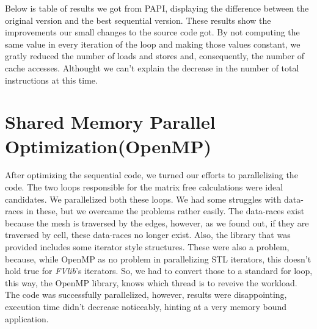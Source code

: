 \documentclass[a4paper,10pt,openright,openbib,twocolumn]{article}
\begin{document}
Below is table of results we got from PAPI, displaying the difference between the original version and the best sequential version. 
These results show the improvements our small changes to the source code got. By not computing the same value in every iteration of the loop and making those values constant, we gratly reduced the number of loads and stores and, consequently, the number of cache accesses. Althought we can't explain the decrease in the number of total instructions at this time. 

\begin{table}[!htp]
    \caption{PAPI comparison}
    \label{tab:testcases}
\end{table}



\section{Shared Memory Parallel Optimization(OpenMP)}
\label{sec:openmp}
After optimizing the sequential code, we turned our efforts to parallelizing the code. The two loops responsible for the matrix free calculations were ideal candidates. We parallelized both these loops. We had some struggles with data-races in these, but we overcame the problems rather easily. The data-races exist because the mesh is traversed by the edges, however, as we found out, if they are traversed by cell, these data-races no longer exist. Also, the library that was provided includes some iterator style structures. These were also a problem, because, while OpenMP as no problem in parallelizing STL iterators, this doesn't hold true for \emph{FVlib}'s iterators. So, we had to convert those to a standard for loop, this way, the OpenMP library, knows which thread is to reveive the workload. The code was successfully parallelized, however, results were disappointing, execution time didn't decrease noticeably, hinting at a very memory bound application. 
\end{document}
